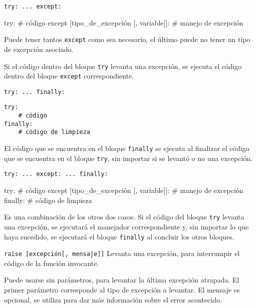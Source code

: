 \begin{referencia_python}

\begin{sintaxis}{\lstinline{try: ... except:}}
\begin{codigo-python-sn}
try:
	# código
except [tipo_de_excepción [, variable]]:
	# manejo de excepción
\end{codigo-python-sn}

Puede tener tantos \lstinline!except! como sea necesario, el último puede
no tener un tipo de excepción asociado.

Si el código dentro del bloque \lstinline!try! levanta una excepción, se
ejecuta el código dentro del bloque \lstinline!except! correspondiente.
\end{sintaxis}

\begin{sintaxis}{\lstinline{try: ... finally:}}
\begin{lstlisting}[numbers=none]
try:
	# código
finally:
	# código de limpieza
\end{lstlisting}

El código que se encuentra en el bloque \lstinline!finally! se ejecuta al
finalizar el código que se encuentra en el bloque \lstinline!try!, sin
importar si se levantó o no una excepción.
\end{sintaxis}

\begin{sintaxis}{\lstinline{try: ... except: ... finally:}}
\begin{codigo-python-sn}
try:
	# código
except [tipo_de_excepción [, variable]]:
	# manejo de excepción
finally:
	# código de limpieza
\end{codigo-python-sn}

Es una combinación de los otros dos casos.  Si el código del bloque
\lstinline!try! levanta una excepción, se ejecutará el manejador
correspondiente y, sin importar lo que haya sucedido, se ejecutará el
bloque \lstinline!finally! al concluir los otros bloques.
\end{sintaxis}


\begin{sintaxis}{\lstinline{raise [excepción[, mensaje]]}}
Levanta una excepción, para interrumpir el código de la función invocante.

Puede usarse sin parámetros, para levantar la última excepción atrapada.
El primer parámetro corresponde al tipo de excepción a levantar.
El mensaje es opcional, se utiliza para dar más información sobre el error
acontecido.
\end{sintaxis}

\end{referencia_python}


